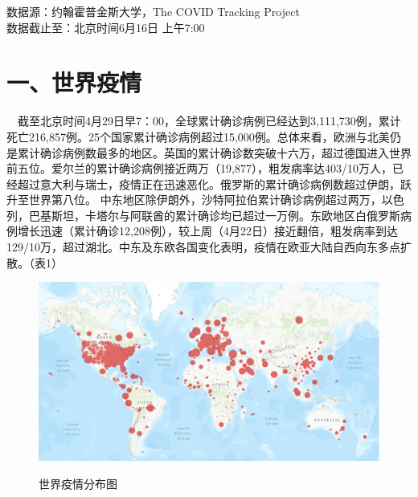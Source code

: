 \documentclass[]{article}
\begin{document}
%
  \noindent{}%

\begin{Large}
{数据源：约翰霍普金斯大学，The COVID Tracking Project \\ 数据截止至：北京时间6月16日 上午7:00}
\end{Large}

\vspace{-7mm}

\hypertarget{section-2}{%
\section{\texorpdfstring{\textcolor{glaucous}{\Huge 一、世界疫情}}{}}\label{section-2}}

\vspace{-5mm}

\(\quad\)截至北京时间4月29日早7：00，全球累计确诊病例已经达到3,111,730例，累计死亡216,857例。25个国家累计确诊病例超过15,000例。总体来看，欧洲与北美仍是累计确诊病例数最多的地区。英国的累计确诊数突破十六万，超过德国进入世界前五位。爱尔兰的累计确诊病例接近两万（19,877），粗发病率达403/10万人，已经超过意大利与瑞士，疫情正在迅速恶化。俄罗斯的累计确诊病例数超过伊朗，跃升至世界第八位。
中东地区除伊朗外，沙特阿拉伯累计确诊病例超过两万，以色列，巴基斯坦，卡塔尔与阿联酋的累计确诊均已超过一万例。东欧地区白俄罗斯病例增长迅速（累计确诊12,208例），较上周（4月22日）接近翻倍，粗发病率到达129/10万，超过湖北。中东及东欧各国变化表明，疫情在欧亚大陆自西向东多点扩散。（表1）

\begin{figure}[H]
\caption{世界疫情分布图} %
\centering
\includegraphics[]{./input/covid1.png} %
\label{} %
\end{figure}
\end{document}
